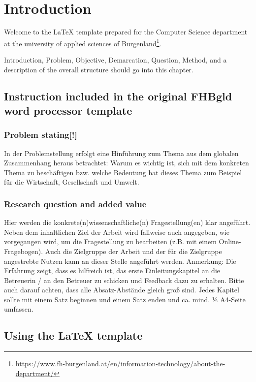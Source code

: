 
\chapter{Introduction}
Welcome to the \LaTeX{} template prepared for the Computer Science department at the university of applied sciences of Burgenland\footnote{\url{https://www.fh-burgenland.at/en/information-technology/about-the-department/}}. 

Introduction, Problem, Objective, Demarcation, Question, Method, and a description of the overall structure should go into this chapter.

\section{Instruction included in the original FHBgld word processor template}
\subsection{Problem stating[!]}
In der Problemstellung erfolgt eine Hinführung zum Thema aus dem globalen
Zusammenhang heraus betrachtet: Warum es wichtig ist, sich mit dem konkreten
Thema zu beschäftigen bzw. welche Bedeutung hat dieses Thema zum Beispiel für die
Wirtschaft, Gesellschaft und Umwelt.
\subsection{Research question and added value}
Hier werden die konkrete(n)wissenschaftliche(n) Fragestellung(en) klar angeführt.
Neben dem inhaltlichen Ziel der Arbeit wird fallweise auch angegeben, wie
vorgegangen wird, um die Fragestellung zu bearbeiten (z.B. mit einem Online-
Fragebogen). Auch die Zielgruppe der Arbeit und der für die Zielgruppe angestrebte
Nutzen kann an dieser Stelle angeführt werden.
Anmerkung:
Die Erfahrung zeigt, dass es hilfreich ist, das erste Einleitungskapitel an die Betreuerin
/ an den Betreuer zu schicken und Feedback dazu zu erhalten.
Bitte auch darauf achten, dass alle Absatz-Abstände gleich groß sind.
Jedes Kapitel sollte mit einem Satz beginnen und einem Satz enden und ca. mind. 1⁄2
A4-Seite umfassen.

\section{Using the \LaTeX{} template}

